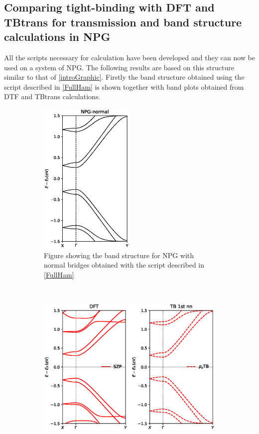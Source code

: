 \subsection{Comparing tight-binding with DFT and TBtrans for transmission and band structure calculations in NPG}\label{CompTB}
All the scripts necessary for calculation have been developed and they can now be used on a system of NPG.
The following results are based on this structure similar to that of \cref{introGraphic}. Firstly the band structure obtained using the script described in \cref{FullHam} is shown together with  band plots obtained from DTF and TBtrans calculations.
\begin{figure}[H]
	\centering
	\begin{subfigure}[t]{0.45\textwidth}
		\centering
		\includegraphics[width=0.5\textwidth]{Figures/NPG-normalBandstructures.eps}
		\caption{Figure showing the band structure for NPG with normal bridges obtained with the script described in \cref{FullHam}}
		\label{bsscript}
	\end{subfigure}
	~  %
	\begin{subfigure}[t]{0.45\textwidth}
		\centering
		\includegraphics[width=\textwidth]{Figures/bands.eps}

\end{subfigure}
\end{figure}
